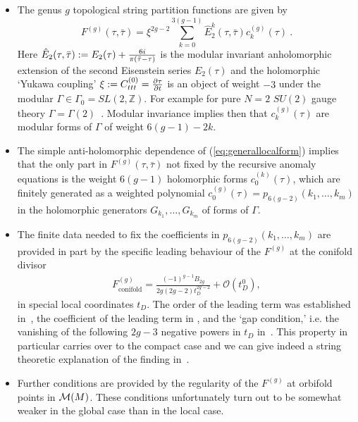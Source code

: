 \documentclass[12pt]{article}
\begin{document}
\begin{itemize}
\item The genus $g$ topological string partition functions are given by
\begin{equation}
F^{(g)}(\tau, \bar \tau)=\xi^{2g-2} \sum_{k=0}^{3(g-1)}
\hat E_2^{k}(\tau,\bar \tau) c^{(g)}_k(\tau)\ .
\label{eq:generallocalform}
\end{equation}
Here $\hat E_2(\tau,\bar \tau):= E_2(\tau) + {6 i \over \pi(\bar \tau-\tau)}$ is the
modular invariant anholomorphic extension of the second Eisenstein series
$E_2(\tau)$ and the holomorphic `Yukawa coupling'
$\xi:=C^{(0)}_{ttt}={\partial \tau \over \partial t}$ is an
object of weight $-3$ under the modular $\Gamma\in \Gamma_0=SL(2,\mathbb{Z})$.
For example for pure $N=2$ $SU(2)$ gauge theory $\Gamma=\Gamma(2)$~\cite{Seiberg:1994rs}.
Modular invariance implies then that $c^{(g)}_k(\tau)$ are modular forms of
$\Gamma$ of weight $6(g-1)-2k$.
\item The simple anti-holomorphic dependence of (\ref{eq:generallocalform}) implies
that the only part in $F^{(g)}(\tau, \bar \tau)$ not fixed by the recursive anomaly
equations is the weight $6(g-1)$ holomorphic forms $c^{(k)}_0(\tau)$, which
are finitely generated as a weighted polynomial $c^{(g)}_0(\tau)=p_{6(g-2)}(k_1,\ldots,k_m)$
in the holomorphic generators $G_{k_1},\ldots,G_{k_m}$ of forms of $\Gamma$.
\item The finite data needed to fix the coefficients in $p_{6(g-2)}(k_1,\ldots,k_m)$
are provided in part by the specific leading behaviour of the $F^{(g)}$ at the conifold divisor
\begin{eqnarray} \label{thegap}
F^{(g)}_{\textrm{conifold}}=\frac{(-1)^{g-1}B_{2g}}{2g(2g-2)t_D^{2g-2}}+\mathcal{O}(t_D^0),
\end{eqnarray}
in special local coordinates $t_D$. The order of the leading term
was established in~\cite{BCOV}, the coefficient of the leading
term in \cite{Ghoshal:1995}, and the `gap condition,' i.e. the
vanishing of the following $2g-3$ negative powers in $t_D$
in~\cite{Huang}. This property in particular carries over to the
compact case and we can give indeed a string theoretic explanation
of the finding in~\cite{Huang}.
\item Further conditions are provided by the regularity of the
$F^{(g)}$ at orbifold points in ${\cal M}(M)$. These conditions
unfortunately turn out to be somewhat weaker in the global case
than in the local case.
\end{itemize}
\end{document}

